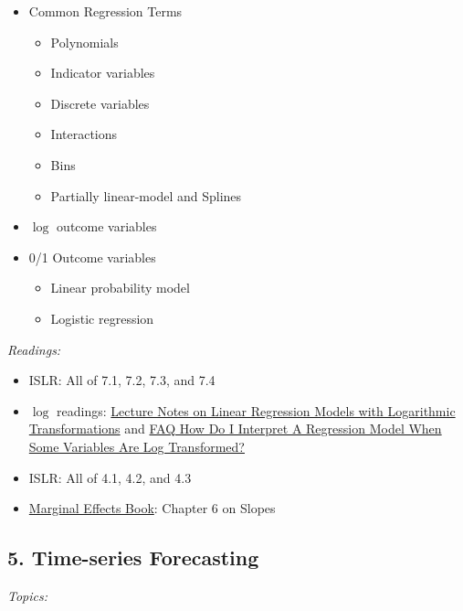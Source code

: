 \documentclass[12pt]{article}
\begin{document}
\begin{itemize}
  \item Common Regression Terms
  \begin{itemize}
    \item Polynomials
    \item Indicator variables
    \item Discrete variables
    \item Interactions
    \item Bins 
    \item Partially linear-model and Splines
  \end{itemize}

  \item $\log$ outcome variables
  
  \item 0/1 Outcome variables
  \begin{itemize}
    \item Linear probability model

    \item Logistic regression
  \end{itemize}
\end{itemize}

\bigskip
\noindent\emph{Readings:}

\begin{itemize}

  \item ISLR: All of 7.1, 7.2, 7.3, and 7.4
  \item $\log$ readings: \href{https://kenbenoit.net/assets/courses/ME104/logmodels2.pdf}{Lecture Notes on Linear Regression Models with Logarithmic Transformations} and \href{https://stats.oarc.ucla.edu/other/mult-pkg/faq/general/faqhow-do-i-interpret-a-regression-model-when-some-variables-are-log-transformed/}{FAQ How Do I Interpret A Regression Model When Some Variables Are Log Transformed?}
  \item ISLR: All of 4.1, 4.2, and 4.3
  \item \href{https://marginaleffects.com/chapters/slopes.html}{Marginal Effects Book}: Chapter 6 on Slopes
\end{itemize}



\subsection*{5. Time-series Forecasting}

\noindent\emph{Topics:}
\end{document}
